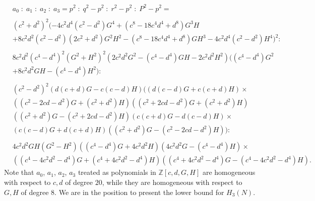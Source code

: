 \documentclass[10pt]{amsart}
\theoremstyle{plain}
\def\bbb{\mathbb}
\newcommand{\Z}{\bbb{Z}}
\begin{document}
\begin{equation}\label{a1a2a3a4solution}
\begin{aligned}
	& a_0 \; : \; a_1 \; : \; a_2 \; : \; a_3 = p^2 \; : \; q^2-p^2 \; : \; 
r^2-p^2 \; : \; P^2-p^2 = \\
	& \\
& (c^2+d^2)^2 (-4c^2d^4(c^2-d^2) G^4 + (c^8-18c^4d^4+d^8) G^3 H \\
& + 8c^2d^2(c^2-d^2)(2c^2+d^2) G^2 H^2 - (c^8-18c^4d^4+d^8) G H^3 - 4c^2d^4(c^2-d^2) H^4)^2: \\
	& \\
& 8c^2d^2(c^4-d^4)^2 (G^2+H^2)^2 (2c^2d^2 G^2 - (c^4-d^4) G H - 2c^2d^2 H^2)((c^
4-d^4) G^2 \\
& + 8c^2d^2 G H - (c^4-d^4)H^2): \\
	& \\
& (c^2-d^2)^2(d(c+d) G - c(c-d) H)((d(c-d) G + c(c+d) H) \times \\
	& ((c^2-2c d-d^2) G + (c^2+d^2) H) ((c^2+2c d-d^2) G + (c^2+d^2) H) \\
	& ((c^2+d^2) G - (c^2+2c d-d^2) H) (c(c+d) G - d(c-d) H) \times\\
	& (c(c-d) G + d(c+d) H)((c^2+d^2) G - (c^2-2 c d-d^2) H)): \\
	& \\
& 4c^2d^2G H(G^2-H^2)((c^4-d^4) G + 4c^2d^2 H)(4c^2d^2 G - (c^4-d^4) H) \times \\
	& ((c^4-4c^2d^2-d^4) G + (c^4+4c^2d^2-d^4) H) ((c^4+4c^2d^2-d^4) G - (c^
4-4c^2d^2-d^4) H).
\end{aligned}
\end{equation}
Note that $a_0$, $a_1$, $a_2$, $a_3$ treated as polynomials in $\Z[c,d,G,H]$
are homogeneous with respect to $c,d$ of degree $20$,  while they are homogeneous with respect to $G,H$ of degree $8$. We are in the position to present the lower bound for $H_{3}(N)$.
\end{document}

